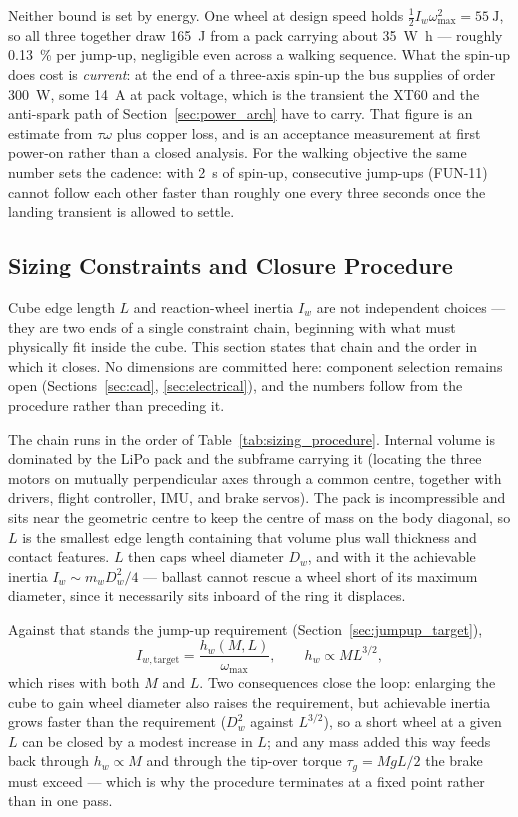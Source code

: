 Neither bound is set by energy. One wheel at design speed holds
$\tfrac12 I_w\omega_{\max}^2 = \qty{55}{\joule}$, so all three together draw
\qty{165}{\joule} from a pack carrying about \qty{35}{\watt\hour} --- roughly
\qty{0.13}{\percent} per jump-up, negligible even across a walking sequence.
What the spin-up does cost is \emph{current}: at the end of a three-axis
spin-up the bus supplies of order \qty{300}{\watt}, some \qty{14}{\ampere} at
pack voltage, which is the transient the XT60 and the anti-spark path of
Section~\ref{sec:power_arch} have to carry. That figure is an estimate from
$\tau\omega$ plus copper loss, and is an acceptance measurement at first
power-on rather than a closed analysis. For the walking objective the same
number sets the cadence: with \qty{2}{\second} of spin-up, consecutive
jump-ups (FUN-11) cannot follow each other faster than roughly one every three
seconds once the landing transient is allowed to settle.

\subsection{Sizing Constraints and Closure Procedure}
\label{sec:massbudget}

Cube edge length $L$ and reaction-wheel inertia $I_w$ are not independent
choices --- they are two ends of a single constraint chain, beginning with
what must physically fit inside the cube. This section states that chain and
the order in which it closes. No dimensions are committed here: component
selection remains open (Sections~\ref{sec:cad}, \ref{sec:electrical}), and the
numbers follow from the procedure rather than preceding it.

The chain runs in the order of Table~\ref{tab:sizing_procedure}. Internal
volume is dominated by the LiPo pack and the subframe carrying it (locating
the three motors on mutually perpendicular axes through a common centre,
together with drivers, flight controller, IMU, and brake servos). The pack is
incompressible and sits near the geometric centre to keep the centre of mass
on the body diagonal, so $L$ is the smallest edge length containing that
volume plus wall thickness and contact features. $L$ then caps wheel diameter
$D_w$, and with it the achievable inertia $I_w \sim m_wD_w^2/4$ --- ballast
cannot rescue a wheel short of its maximum diameter, since it necessarily sits
inboard of the ring it displaces.

Against that stands the jump-up requirement (Section~\ref{sec:jumpup_target}),
\[
I_{w,\text{target}} = \frac{h_w(M, L)}{\omega_{\max}},
\qquad
h_w \propto M L^{3/2},
\]
which rises with both $M$ and $L$. Two consequences close the loop: enlarging
the cube to gain wheel diameter also raises the requirement, but achievable
inertia grows faster than the requirement ($D_w^2$ against $L^{3/2}$), so a
short wheel at a given $L$ can be closed by a modest increase in $L$; and any
mass added this way feeds back through $h_w\propto M$ and through the tip-over
torque $\tau_g=MgL/2$ the brake must exceed --- which is why the procedure
terminates at a fixed point rather than in one pass.

